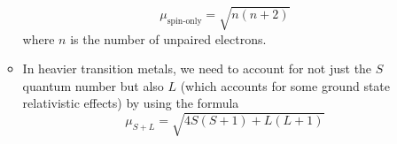 \documentclass[../notes.tex]{subfiles}
\begin{document}
\begin{itemize}
\begin{itemize}
        \begin{equation*}
            \mu_\text{spin-only} = \sqrt{n(n+2)}
        \end{equation*}
        where $n$ is the number of unpaired electrons.
        \item In heavier transition metals, we need to account for not just the $S$ quantum number but also $L$ (which accounts for some ground state relativistic effects) by using the formula
        \begin{equation*}
            \mu_{S+L} = \sqrt{4S(S+1)+L(L+1)}
        \end{equation*}
    \end{itemize}
\end{itemize}



\end{document}
